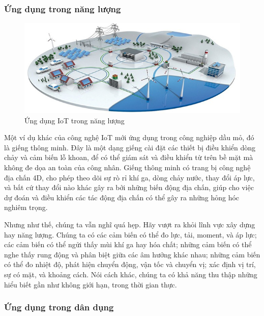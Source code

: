 \subsubsection*{Ứng dụng trong năng lượng }

\begin{figure}[H] 
	\centering    
	\includegraphics[width=1\textwidth]{pic9}
	\caption[Ứng dụng IoT trong năng lượng]{Ứng dụng IoT trong năng lượng}
	\label{fig:pic9}
\end{figure}
Một ví dụ khác của công nghệ IoT mới ứng dụng trong công nghiệp dầu mỏ, đó là giếng thông minh. Đây là một dạng giếng cài đặt các thiết bị điều khiển dòng chảy và cảm biến lỗ khoan, để có thể giám sát và điều khiển từ trên bề mặt mà không đe dọa an toàn của công nhân. Giếng thông minh có trang bị công nghệ địa chấn 4D, cho phép theo dõi sự rò rỉ khí ga, dòng chảy nước, thay đổi áp lực, và bất cứ thay đổi nào khác gây ra bởi những biến động địa chấn, giúp cho việc dự đoán và điều khiển các tác động địa chấn có thể gây ra những hỏng hóc nghiêm trọng.

Nhưng như thế, chúng ta vẫn nghĩ quá hẹp. Hãy vượt ra khỏi lĩnh vực xây dựng hay năng lượng. Chúng ta có các cảm biến có thể đo lực, tải, moment, và áp lực; các cảm biến có thể ngửi thấy mùi khí ga hay hóa chất; những cảm biến có thể nghe thấy rung động và phân biệt giữa các âm hưởng khác nhau; những cảm biến có thể đo nhiệt độ, phát hiện chuyển động, vận tốc và chuyển vị; xác định vị trí, sự có mặt, và khoảng cách. Nói cách khác, chúng ta có khả năng thu thập những hiểu biết gần như không giới hạn, trong thời gian thực.

\subsubsection*{Ứng dụng trong dân dụng  }

